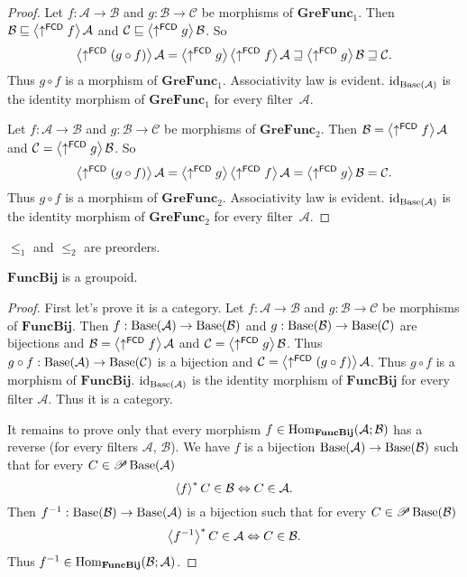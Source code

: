 \begin{proof}
Let $f:\mathcal{A}\rightarrow\mathcal{B}$ and $g:\mathcal{B}\rightarrow\mathcal{C}$
be morphisms of $\mathbf{GreFunc}_{1}$. Then $\mathcal{B}\sqsubseteq\left\langle \uparrow^{\mathsf{FCD}}f\right\rangle\mathcal{A}$
and $\mathcal{C}\sqsubseteq\left\langle \uparrow^{\mathsf{FCD}}g\right\rangle\mathcal{B}$.
So 
\[
\left\langle \uparrow^{\mathsf{FCD}}(g\circ f)\right\rangle\mathcal{A}=\left\langle \uparrow^{\mathsf{FCD}}g\right\rangle\left\langle \uparrow^{\mathsf{FCD}}f\right\rangle\mathcal{A}\sqsupseteq\left\langle \uparrow^{\mathsf{FCD}}g\right\rangle\mathcal{B}\sqsupseteq\mathcal{C}.
\]
Thus $g\circ f$ is a morphism of $\mathbf{GreFunc}_{1}$. Associativity
law is evident. $\operatorname{id}_{\operatorname{Base}(\mathcal{A})}$ is the identity morphism
of $\mathbf{GreFunc}_{1}$ for every filter~$\mathcal{A}$.

Let $f:\mathcal{A}\rightarrow\mathcal{B}$ and $g:\mathcal{B}\rightarrow\mathcal{C}$
be morphisms of $\mathbf{GreFunc}_{2}$. Then $\mathcal{B}=\left\langle \uparrow^{\mathsf{FCD}}f\right\rangle\mathcal{A}$
and $\mathcal{C}=\left\langle \uparrow^{\mathsf{FCD}}g\right\rangle\mathcal{B}$. So
\[
\left\langle \uparrow^{\mathsf{FCD}}(g\circ f)\right\rangle\mathcal{A}=\left\langle \uparrow^{\mathsf{FCD}}g\right\rangle\left\langle \uparrow^{\mathsf{FCD}}f\right\rangle\mathcal{A}=\left\langle \uparrow^{\mathsf{FCD}}g\right\rangle\mathcal{B}=\mathcal{C}.
\]
Thus $g\circ f$ is a morphism of $\mathbf{GreFunc}_{2}$. Associativity
law is evident. $\operatorname{id}_{\operatorname{Base}(\mathcal{A})}$ is the identity morphism
of $\mathbf{GreFunc}_{2}$ for every filter~$\mathcal{A}$.\end{proof}
\begin{cor}
$\le_{1}$ and $\le_{2}$ are preorders. \end{cor}
\begin{thm}
$\mathbf{FuncBij}$ is a groupoid.\end{thm}
\begin{proof}
First let's prove it is a category. Let $f:\mathcal{A}\rightarrow\mathcal{B}$
and $g:\mathcal{B}\rightarrow\mathcal{C}$ be morphisms of $\mathbf{FuncBij}$.
Then $f:\operatorname{Base}(\mathcal{A})\rightarrow\operatorname{Base}(\mathcal{B})$ and $g:\operatorname{Base}(\mathcal{B})\rightarrow\operatorname{Base}(\mathcal{C})$
are bijections and $\mathcal{B}=\left\langle \uparrow^{\mathsf{FCD}}f\right\rangle\mathcal{A}$
and $\mathcal{C}=\left\langle \uparrow^{\mathsf{FCD}}g\right\rangle\mathcal{B}$. Thus
$g\circ f:\operatorname{Base}(\mathcal{A})\rightarrow\operatorname{Base}(\mathcal{C})$ is a bijection
and $\mathcal{C}=\left\langle \uparrow^{\mathsf{FCD}}(g\circ f)\right\rangle\mathcal{A}$.
Thus $g\circ f$ is a morphism of $\mathbf{FuncBij}$. $\operatorname{id}_{\operatorname{Base}(\mathcal{A})}$
is the identity morphism of $\mathbf{FuncBij}$ for every filter $\mathcal{A}$.
Thus it is a category.

It remains to prove only that every morphism $f\in\operatorname{Hom}_{\mathbf{FuncBij}}(\mathcal{A};\mathcal{B})$
has a reverse (for every filters $\mathcal{A}$, $\mathcal{B}$).
We have $f$ is a bijection $\operatorname{Base}(\mathcal{A})\rightarrow\operatorname{Base}(\mathcal{B})$
such that for every $C\in\mathscr{P}\operatorname{Base}(\mathcal{A})$
\[
\left\langle f\right\rangle ^{\ast}C\in\mathcal{B}\Leftrightarrow C\in\mathcal{A}.
\]
Then $f^{-1}:\operatorname{Base}(\mathcal{B})\rightarrow\operatorname{Base}(\mathcal{A})$ is
a bijection such that for every $C\in\mathscr{P}\operatorname{Base}(\mathcal{B})$
\[
\left\langle f^{-1}\right\rangle ^{\ast}C\in\mathcal{A}\Leftrightarrow C\in\mathcal{B}.
\]
 Thus $f^{-1}\in\operatorname{Hom}_{\mathbf{FuncBij}}(\mathcal{B};\mathcal{A})$.\end{proof}

